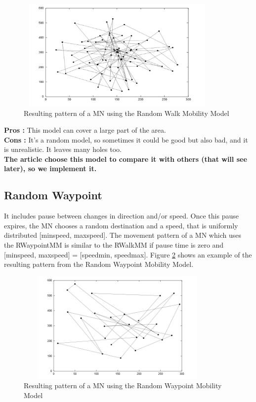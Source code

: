 \begin{figure}[h]
\center
\includegraphics[width=10cm,height=55mm]{../images/randomwalk1.png}
\caption{\label{RandomWalkFig}Resulting pattern of a MN using the Random Walk Mobility Model\cite{SurveyMobilityModelsAdHoc1}}
\end{figure}

\noindent\textbf{Pros :} This model can cover a large part of the area.\\
\textbf{Cons :} It's a random model, so sometimes it could be good but also bad, and it is unrealistic. It leaves many holes too.\\

\textbf{The article choose this model to compare it with others (that will see later), so we implement it.}\\

\subsection{Random Waypoint}

It includes pause between changes in direction and/or speed. Once this pause expires, the MN chooses a random destination and a speed, that is uniformly distributed [minspeed, maxspeed]. The movement pattern of a MN which uses the RWaypointMM is similar to the RWalkMM if pause time is zero and [minspeed, maxspeed] = [speedmin, speedmax]. Figure \ref{RandomWaypointFig} shows an example of the resulting pattern from the Random Waypoint Mobility Model.\\

\begin{figure}[h]
\center
\includegraphics[width=10cm,height=55mm]{../images/randomwaypoint1.png}
\caption{\label{RandomWaypointFig}Resulting pattern of a MN using the Random Waypoint Mobility Model\cite{SurveyMobilityModelsAdHoc1}}
\end{figure}

